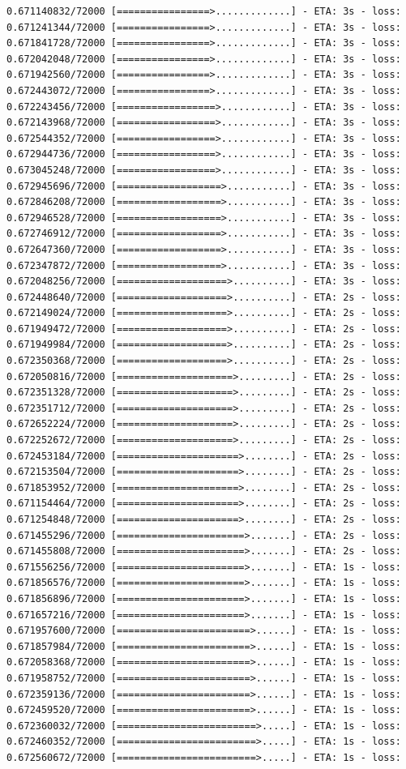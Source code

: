 \documentclass[12pt,fleqn]{article}\usepackage{../../common}
\begin{document}
\begin{verbatim}
0.671140832/72000 [================>.............] - ETA: 3s - loss: 0.671241344/72000 [================>.............] - ETA: 3s - loss: 0.671841728/72000 [================>.............] - ETA: 3s - loss: 0.672042048/72000 [================>.............] - ETA: 3s - loss: 0.671942560/72000 [================>.............] - ETA: 3s - loss: 0.672443072/72000 [================>.............] - ETA: 3s - loss: 0.672243456/72000 [=================>............] - ETA: 3s - loss: 0.672143968/72000 [=================>............] - ETA: 3s - loss: 0.672544352/72000 [=================>............] - ETA: 3s - loss: 0.672944736/72000 [=================>............] - ETA: 3s - loss: 0.673045248/72000 [=================>............] - ETA: 3s - loss: 0.672945696/72000 [==================>...........] - ETA: 3s - loss: 0.672846208/72000 [==================>...........] - ETA: 3s - loss: 0.672946528/72000 [==================>...........] - ETA: 3s - loss: 0.672746912/72000 [==================>...........] - ETA: 3s - loss: 0.672647360/72000 [==================>...........] - ETA: 3s - loss: 0.672347872/72000 [==================>...........] - ETA: 3s - loss: 0.672048256/72000 [===================>..........] - ETA: 3s - loss: 0.672448640/72000 [===================>..........] - ETA: 2s - loss: 0.672149024/72000 [===================>..........] - ETA: 2s - loss: 0.671949472/72000 [===================>..........] - ETA: 2s - loss: 0.671949984/72000 [===================>..........] - ETA: 2s - loss: 0.672350368/72000 [===================>..........] - ETA: 2s - loss: 0.672050816/72000 [====================>.........] - ETA: 2s - loss: 0.672351328/72000 [====================>.........] - ETA: 2s - loss: 0.672351712/72000 [====================>.........] - ETA: 2s - loss: 0.672652224/72000 [====================>.........] - ETA: 2s - loss: 0.672252672/72000 [====================>.........] - ETA: 2s - loss: 0.672453184/72000 [=====================>........] - ETA: 2s - loss: 0.672153504/72000 [=====================>........] - ETA: 2s - loss: 0.671853952/72000 [=====================>........] - ETA: 2s - loss: 0.671154464/72000 [=====================>........] - ETA: 2s - loss: 0.671254848/72000 [=====================>........] - ETA: 2s - loss: 0.671455296/72000 [======================>.......] - ETA: 2s - loss: 0.671455808/72000 [======================>.......] - ETA: 2s - loss: 0.671556256/72000 [======================>.......] - ETA: 1s - loss: 0.671856576/72000 [======================>.......] - ETA: 1s - loss: 0.671856896/72000 [======================>.......] - ETA: 1s - loss: 0.671657216/72000 [======================>.......] - ETA: 1s - loss: 0.671957600/72000 [=======================>......] - ETA: 1s - loss: 0.671857984/72000 [=======================>......] - ETA: 1s - loss: 0.672058368/72000 [=======================>......] - ETA: 1s - loss: 0.671958752/72000 [=======================>......] - ETA: 1s - loss: 0.672359136/72000 [=======================>......] - ETA: 1s - loss: 0.672459520/72000 [=======================>......] - ETA: 1s - loss: 0.672360032/72000 [========================>.....] - ETA: 1s - loss: 0.672460352/72000 [========================>.....] - ETA: 1s - loss: 0.672560672/72000 [========================>.....] - ETA: 1s - loss: 
\end{verbatim}
\end{document}
